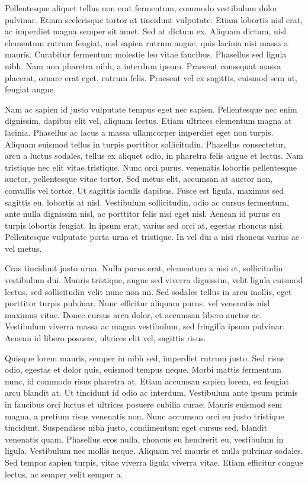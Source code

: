 \documentclass[sigconf]{acmart}
\begin{document}
Pellentesque aliquet tellus non erat fermentum, commodo vestibulum dolor pulvinar. Etiam scelerisque tortor at tincidunt vulputate. Etiam lobortis nisl erat, ac imperdiet magna semper sit amet. Sed at dictum ex. Aliquam dictum, nisl elementum rutrum feugiat, nisl sapien rutrum augue, quis lacinia nisi massa a mauris. Curabitur fermentum molestie leo vitae faucibus. Phasellus sed ligula nibh. Nam non pharetra nibh, a interdum ipsum. Praesent consequat massa placerat, ornare erat eget, rutrum felis. Praesent vel ex sagittis, euismod sem ut, feugiat augue.

Nam ac sapien id justo vulputate tempus eget nec sapien. Pellentesque nec enim dignissim, dapibus elit vel, aliquam lectus. Etiam ultrices elementum magna at lacinia. Phasellus ac lacus a massa ullamcorper imperdiet eget non turpis. Aliquam euismod tellus in turpis porttitor sollicitudin. Phasellus consectetur, arcu a luctus sodales, tellus ex aliquet odio, in pharetra felis augue et lectus. Nam tristique nec elit vitae tristique. Nunc orci purus, venenatis lobortis pellentesque auctor, pellentesque vitae tortor. Sed metus elit, accumsan at auctor non, convallis vel tortor. Ut sagittis iaculis dapibus. Fusce est ligula, maximus sed sagittis eu, lobortis at nisl. Vestibulum sollicitudin, odio ac cursus fermentum, ante nulla dignissim nisl, ac porttitor felis nisi eget nisl. Aenean id purus eu turpis lobortis feugiat. In ipsum erat, varius sed orci at, egestas rhoncus nisi. Pellentesque vulputate porta urna et tristique. In vel dui a nisi rhoncus varius ac vel metus.

Cras tincidunt justo urna. Nulla purus erat, elementum a nisi et, sollicitudin vestibulum dui. Mauris tristique, augue sed viverra dignissim, velit ligula euismod lectus, sed sollicitudin velit nunc non mi. Sed sodales tellus in arcu mollis, eget porttitor turpis pulvinar. Nunc efficitur aliquam purus, vel venenatis nisl maximus vitae. Donec cursus arcu dolor, et accumsan libero auctor ac. Vestibulum viverra massa ac magna vestibulum, sed fringilla ipsum pulvinar. Aenean id libero posuere, ultrices elit vel, sagittis risus.

Quisque lorem mauris, semper in nibh sed, imperdiet rutrum justo. Sed risus odio, egestas et dolor quis, euismod tempus neque. Morbi mattis fermentum nunc, id commodo risus pharetra at. Etiam accumsan sapien lorem, eu feugiat arcu blandit at. Ut tincidunt id odio ac interdum. Vestibulum ante ipsum primis in faucibus orci luctus et ultrices posuere cubilia curae; Mauris euismod sem magna, a pretium risus venenatis non. Nunc accumsan orci eu justo tristique tincidunt. Suspendisse nibh justo, condimentum eget cursus sed, blandit venenatis quam. Phasellus eros nulla, rhoncus eu hendrerit eu, vestibulum in ligula. Vestibulum nec mollis neque. Aliquam vel mauris et nulla pulvinar sodales. Sed tempor sapien turpis, vitae viverra ligula viverra vitae. Etiam efficitur congue lectus, ac semper velit semper a.
\end{document}

